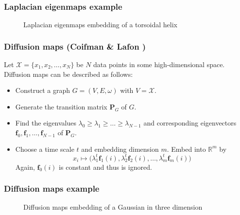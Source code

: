 \documentclass[professionalfonts, hyperref={pdfpagelabels=false,
  colorlinks=true, linkcolor=purple}]{beamer}
\begin{document}
\begin{frame}[label=laplacian_example]
  \frametitle{Laplacian eigenmaps example}
  \begin{figure}[htbp]
    \label{fig:helix}
    \centering
    \hspace{3pt}
    \caption{Laplacian eigenmaps embedding of a torsoidal helix}
  \end{figure}
\end{frame}

\begin{frame}[label=diffusion_maps]
  \frametitle{Diffusion maps (Coifman \& Lafon
    \cite{coifman06:_diffus_maps})}
    Let $\mathcal{X} = \{x_1,x_2,\dots,x_N\}$ be $N$ data points in some
    high-dimensional space. Diffusion maps can be described as follows:
  \begin{itemize}
  \item Construct a graph $G = (V,E,\omega)$ with $V =
    \mathcal{X}$.
  \item Generate the transition matrix $\bm{P}_G$ of $G$.
  \item Find the eigenvalues $\lambda_0 \geq \lambda_1 \geq \dots
    \geq \lambda_{N-1}$ and corresponding eigenvectors $\bm{f}_0, \bm{f}_1,
    \dots, \bm{f}_{N-1}$ of $\bm{P}_G$.
  \item Choose a time scale $t$ and embedding dimension $m$. Embed
    into $\mathbb{R}^{m}$ by
    \begin{equation}
      \label{eq:6}
      x_i \mapsto \bigl( \lambda_{1}^{t} \bm{f}_{1}(i),
      \lambda_{2}^{t} \bm{f}_{2}(i), \dots, \lambda_{m}^{t}
      \bm{f}_{m}(i))
    \end{equation}
    Again, $\bm{f}_{0}(i)$ is constant and thus is ignored. 
  \end{itemize}
\end{frame}

\begin{frame}[label=diffusion_example]
  \frametitle{Diffusion maps example}
  \begin{figure}[htbp]
    \label{fig:gaussian}
    \centering
    \hspace{3pt}
    \caption{Diffusion maps embedding of a Gaussian in three dimension}
  \end{figure}
\end{frame}
\end{document}
